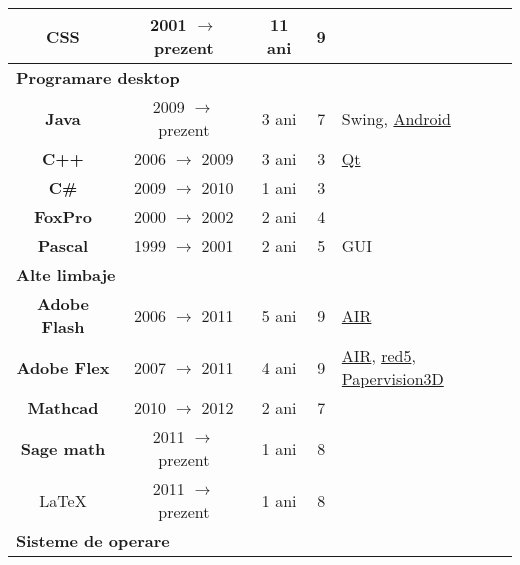 \documentclass[utf8x,helvetica,narrow,romanian,logo,totpages]{europecv}
\begin{document}
\begin{europecv}
{\begin{tabular}{ | c | c | c | c | >{\centering\arraybackslash}p{2.282cm} |}
    \textbf{CSS}
    		& 2001 $\to$ prezent
    		& 11 ani
    		& 9
    		& 
	\\ \hline\hline


    \multicolumn{5}{|l|}{\textbf{Programare desktop}} \\ \hline

    \textbf{Java}
    		& 2009 $\to$ prezent
    		& 3 ani
    		& 7
    		& Swing, \href{http://developer.android.com}{Android}
	\\ \hline

    \textbf{C++}
    		& 2006 $\to$ 2009
    		& 3 ani
    		& 3
    		& \href{http://qt.nokia.com/products/}{Qt}
	\\ \hline

    \textbf{C\#}
    		& 2009 $\to$ 2010
    		& 1 ani
    		& 3
    		& 
	\\ \hline

    \textbf{FoxPro}
    		& 2000 $\to$ 2002
    		& 2 ani
    		& 4
    		& 
	\\ \hline

    \textbf{Pascal}
    		& 1999 $\to$ 2001
    		& 2 ani
    		& 5
    		& GUI
	\\ \hline\hline


    \multicolumn{5}{|l|}{\textbf{Alte limbaje}} \\ \hline

    \textbf{Adobe Flash}
    		& 2006 $\to$ 2011
    		& 5 ani
    		& 9
    		& \href{http://www.adobe.com/products/air.html}{AIR}
	\\ \hline

    \textbf{Adobe Flex}
    		& 2007 $\to$ 2011
    		& 4 ani
    		& 9
    		& \href{http://www.adobe.com/products/air.html}{AIR}, \href{http://www.red5.org/}{red5}, \href{http://blog.papervision3d.org/}{Papervision3D}
	\\ \hline

    \textbf{Mathcad}
    		& 2010 $\to$ 2012
    		& 2 ani
    		& 7
    		& 
	\\ \hline

    \textbf{Sage math}
    		& 2011 $\to$ prezent
    		& 1 ani
    		& 8
    		& 
	\\ \hline

    \LaTeX{}
    		& 2011 $\to$ prezent
    		& 1 ani
    		& 8
    		& 
	\\ \hline \hline


    \multicolumn{5}{|l|}{\textbf{Sisteme de operare}} \\ \hline


\end{tabular}}
\end{europecv}
\end{document}
